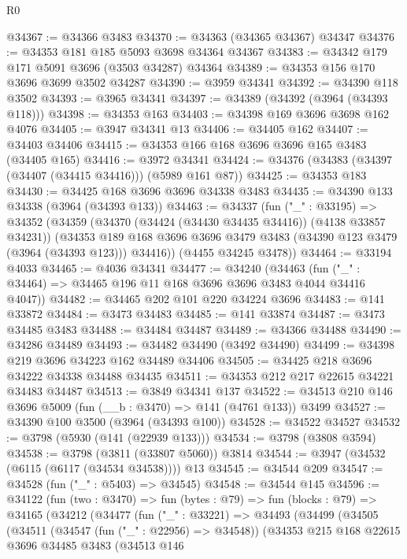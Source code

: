 \begin{lexlean}{R0}
\begin{coremodule}
@34367 := @34366 @3483
@34370 := @34363 (@34365 @34367) @34347
@34376 := @34353 @181 @185 @5093 @3698 @34364 @34367
@34383 := @34342 @179 @171 @5091 @3696 (@3503 @34287) @34364
@34389 := @34353 @156 @170 @3696 @3699 @3502 @34287
@34390 := @3959 @34341
@34392 := @34390 @118 @3502
@34393 := @3965 @34341
@34397 := @34389 (@34392 (@3964 (@34393 @118)))
@34398 := @34353 @163
@34403 := @34398 @169 @3696 @3698 @162 @4076
@34405 := @3947 @34341 @13
@34406 := @34405 @162
@34407 := @34403 @34406
@34415 := @34353 @166 @168 @3696 @3696 @165 @3483 (@34405 @165)
@34416 := @3972 @34341
@34424 := @34376 (@34383 (@34397 (@34407 (@34415 @34416))) (@5989 @161 @87))
@34425 := @34353 @183
@34430 := @34425 @168 @3696 @3696 @34338 @3483
@34435 := @34390 @133 @34338 (@3964 (@34393 @133))
@34463 := @34337
    (fun ("_" : @33195) =>
    @34352
      (@34359
        (@34370 (@34424 (@34430 @34435 @34416)) (@4138 @33857 @34231))
        (@34353 @189 @168 @3696 @3696 @3479 @3483 (@34390 @123 @3479 (@3964 (@34393 @123))) @34416))
      (@4455 @34245 @3478))
@34464 := @33194 @4033
@34465 := @4036 @34341
@34477 := @34240
    (@34463 (fun ("_" : @34464) => @34465 @196 @11 @168 @3696 @3696 @3483 @4044 @34416 @4047))
@34482 := @34465 @202 @101 @220 @34224 @3696
@34483 := @141 @33872
@34484 := @3473 @34483
@34485 := @141 @33874
@34487 := @3473 @34485 @3483
@34488 := @34484 @34487
@34489 := @34366 @34488
@34490 := @34286 @34489
@34493 := @34482 @34490 (@3492 @34490)
@34499 := @34398 @219 @3696 @34223 @162 @34489 @34406
@34505 := @34425 @218 @3696 @34222 @34338 @34488 @34435
@34511 := @34353 @212 @217 @22615 @34221 @34483 @34487
@34513 := @3849 @34341 @137
@34522 := @34513 @210 @146 @3696 @5009 (fun (__b : @3470) => @141 (@4761 @133)) @3499
@34527 := @34390 @100 @3500 (@3964 (@34393 @100))
@34528 := @34522 @34527
@34532 := @3798 (@5930 (@141 (@22939 @133)))
@34534 := @3798 (@3808 @3594)
@34538 := @3798 (@3811 (@33807 @5060)) @3814
@34544 := @3947 (@34532 (@6115 (@6117 (@34534 @34538)))) @13
@34545 := @34544 @209
@34547 := @34528 (fun ("_" : @5403) => @34545)
@34548 := @34544 @145
@34596 := @34122
    (fun (two : @3470) =>
    fun (bytes : @79) =>
    fun (blocks : @79) =>
    @34165
      (@34212
        (@34477
          (fun ("_" : @33221) =>
          @34493
            (@34499
              (@34505
                (@34511
                  (@34547 (fun ("_" : @22956) => @34548))
                  (@34353
                    @215
                    @168
                    @22615
                    @3696
                    @34485
                    @3483
                    (@34513
                      @146

\end{coremodule}
\end{lexlean}
